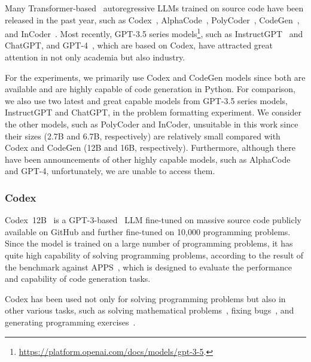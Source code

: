 \documentclass{article}
\begin{document}
Many Transformer-based~\citep{vaswani2017transformer} autoregressive LLMs trained on source code have been released in the past year, such as Codex~\citep{chen2021codex}, AlphaCode~\citep{li2022alphacode}, PolyCoder~\citep{xu2022polycoder}, CodeGen~\citep{nijkamp2022codegen}, and InCoder~\citep{fried2022incoder}.
Most recently, GPT-3.5 series models\footnote{\url{https://platform.openai.com/docs/models/gpt-3-5}.}, such as InstructGPT~\citep{ouyang2022instructgpt} and ChatGPT, and GPT-4~\citep{openai2023gpt-4}, which are based on Codex, have attracted great attention in not only academia but also industry.

For the experiments, we primarily use Codex and CodeGen models since both are available and are highly capable of code generation in Python.
For comparison, we also use two latest and great capable models from GPT-3.5 series models, InstructGPT and ChatGPT, in the problem formatting experiment.
We consider the other models, such as PolyCoder and InCoder, unsuitable in this work since their sizes (2.7B and 6.7B, respectively) are relatively small compared with Codex and CodeGen (12B and 16B, respectively).
Furthermore, although there have been announcements of other highly capable models, such as AlphaCode and GPT-4, unfortunately, we are unable to access them.





\subsubsection{Codex}
\label{sec:experiments:models:codex}

Codex~12B~\citep{chen2021codex} is a GPT-3-based~\citep{brown2020gpt3} LLM fine-tuned on massive source code publicly available on GitHub and further fine-tuned on 10,000 programming problems.
Since the model is trained on a large number of programming problems, it has quite high capability of solving programming problems, according to the result of the benchmark against APPS~\citep{hendrycks2021apps}, which is designed to evaluate the performance and capability of code generation tasks.

Codex has been used not only for solving programming problems but also in other various tasks, such as solving mathematical problems~\citep{drori2021algebra, tang2021probstat, drori2021math}, fixing bugs~\citep{prenner2021repair, pearce2021securitybugs}, and generating programming exercises~\citep{sarsa2022exercise}.
\end{document}
